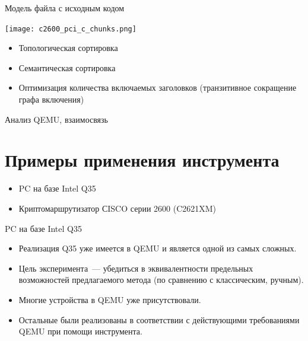 \documentclass[unicode,hyperref={unicode=true}]{beamer}
\newcommand*{\sectionpagekb}{\usebeamertemplate*{section page kb}}
\theoremstyle{definition}
\theoremstyle{plain}
\begin{document}
\begin{frame}{Модель файла с исходным кодом}
\begin{minipage}{0.61\textwidth}
\texttt{[image: c2600\_pci\_c\_chunks.png]}
\end{minipage}
\begin{minipage}{0.37\textwidth}
\begin{itemize}
\item Топологическая сортировка
\item Семантическая сортировка
\item Оптимизация количества включаемых заголовков (транзитивное сокращение
графа включения)
\end{itemize}
\end{minipage}
\end{frame}



\begin{frame}{Анализ QEMU, взаимосвязь}
\end{frame}



\section{Примеры применения инструмента}
\begin{frame}
\sectionpagekb
\begin{itemize}
\item PC на базе Intel Q35
\item Криптомаршрутизатор СISCO серии 2600 (C2621XM)
\end{itemize}
\end{frame}



\begin{frame}{PC на базе Intel Q35}
\begin{itemize}
\item Реализация Q35 уже имеется в QEMU и является одной из самых сложных.
\item Цель эксперимента~--- убедиться в эквивалентности предельных возможностей
предлагаемого метода (по сравнению с классическим, ручным).
\item Многие устройства в QEMU уже присутствовали.
\item Остальные были реализованы в соответствии с действующими требованиями
QEMU при помощи инструмента.
\end{itemize}
\end{frame}
\end{document}
